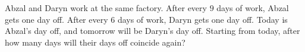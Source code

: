 Abzal and Daryn work at the same factory. After every $9$ days of work, Abzal gets one day off. After every $6$ days of work, Daryn gets one day off. Today is Abzal's day off, and tomorrow will be Daryn's day off. Starting from today, after how many days will their days off coincide again?
